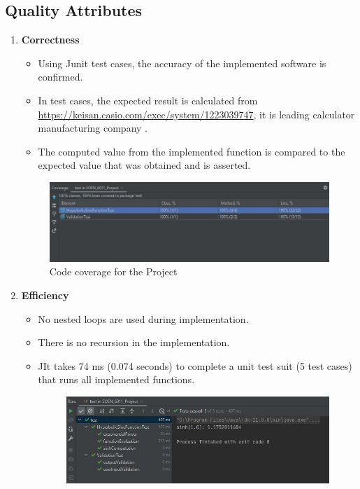 \documentclass[
	12pt
]{article}
\begin{document}
\subsection{Quality Attributes}
\begin{enumerate}
    \item \textbf{Correctness}
    \begin{itemize}
        \item Using Junit test cases, the accuracy of the implemented software is confirmed.
        \item In test
cases, the expected result is calculated from\newline
\url{https://keisan.casio.com/exec/system/1223039747}, it is leading calculator manufacturing
company \cite{casio}. \
\item The computed value from the implemented function is compared to the expected value that was obtained and is asserted.
    \end{itemize}
    \begin{figure}[htp]
    \centering
    \includegraphics[width=12cm]{codecoverage.jpg}
    \caption{Code coverage for the Project}
    \label{Code coverage for the Project}
\end{figure}
\item \textbf{Efficiency}
\begin{itemize}
    \item No nested loops are used during implementation.
    \item There is no recursion in the implementation.
    \item JIt takes 74 ms (0.074 seconds) to complete a unit test suit (5 test cases) that runs all implemented functions.
     \begin{figure}[htp]
    \centering
    \includegraphics[width=12cm]{testcases.jpg}

\end{figure}
\end{itemize}
\end{enumerate}
\end{document}
